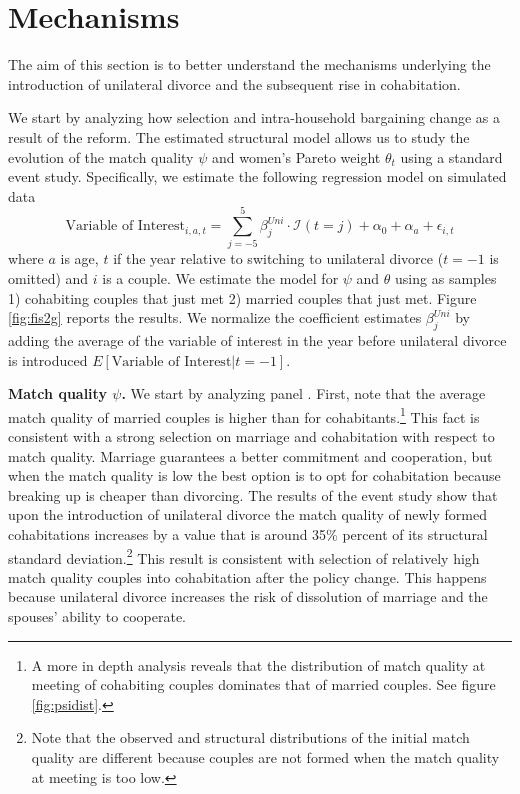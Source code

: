 \documentclass[12pt]{article}
\numberwithin{table}{section}
\begin{document}
\section{Mechanisms}
The aim of this section is to better understand the mechanisms underlying the introduction of unilateral divorce and the subsequent rise in cohabitation.

 We start by analyzing how selection and intra-household bargaining change as a result of the reform. The estimated structural model allows us to study the evolution of the match quality $\psi$ and women's Pareto weight $\theta_t$ using a standard event study. Specifically, we estimate the following regression model on simulated data
\begin{equation}\label{eq:ev_stud}
\text{Variable of Interest}_{i,a,t}=\sum_{j=-5}^{5}\beta^{Uni}_j\cdot\mathcal{I}(t=j)+\alpha_{0}+\alpha_{a}+\epsilon_{i,t}
\end{equation}
where $a$ is age, $t$ if the year relative to switching to unilateral divorce ($t=-1$ is omitted) and $i$ is a couple. We estimate the model for $\psi$ and $\theta$ using as samples 1) cohabiting couples that just met 2) married couples that just met.
Figure \ref{fig:fis2g} reports the results. We normalize the coefficient estimates $\beta^{Uni}_j$ by adding the average of the variable of interest in the year before unilateral divorce is introduced $E[\text{Variable of Interest}|t=-1]$. 

\textbf{Match quality $\psi$.} We start by analyzing panel . First, note that the average match quality of married couples is higher than for cohabitants.\footnote{A more in depth analysis reveals that the distribution of match quality at meeting of cohabiting couples dominates that of married couples. See figure \ref{fig:psidist}.} This fact is consistent with a strong selection on marriage and cohabitation with respect to match quality. Marriage guarantees a better commitment and cooperation, but when the match quality is low the best option is to opt for cohabitation because breaking up is cheaper than divorcing. The results of the event study show that upon the introduction of unilateral divorce the match quality of newly formed cohabitations increases by a value that is around 35\% percent of its structural standard deviation.\footnote{Note that the observed and structural distributions of the initial match quality are different because couples are not formed when the match quality at meeting is too low.} This result is consistent with selection of relatively high match quality couples into cohabitation after the policy change. This happens because unilateral divorce increases the risk of dissolution of marriage and the spouses' ability to cooperate. 
\end{document}

